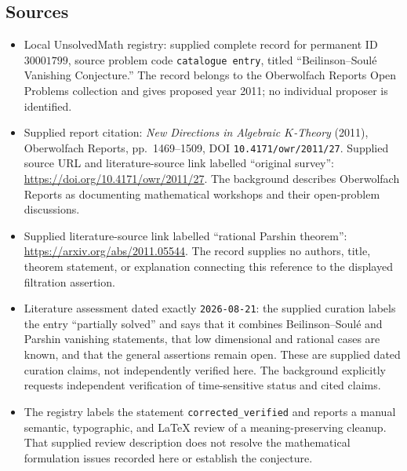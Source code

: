 \documentclass[11pt]{article}
\begin{document}
\subsection{Sources}
\begin{itemize}
\item Local UnsolvedMath registry: supplied complete record for permanent ID \(30001799\), source problem code \texttt{catalogue entry}, titled ``Beilinson--Soul\'e Vanishing Conjecture.'' The record belongs to the Oberwolfach Reports Open Problems collection and gives proposed year 2011; no individual proposer is identified.
\item Supplied report citation: \emph{New Directions in Algebraic \(K\)-Theory} (2011), Oberwolfach Reports, pp.~1469--1509, DOI \texttt{10.4171/owr/2011/27}. Supplied source URL and literature-source link labelled ``original survey'': \url{https://doi.org/10.4171/owr/2011/27}. The background describes Oberwolfach Reports as documenting mathematical workshops and their open-problem discussions.
\item Supplied literature-source link labelled ``rational Parshin theorem'': \url{https://arxiv.org/abs/2011.05544}. The record supplies no authors, title, theorem statement, or explanation connecting this reference to the displayed filtration assertion.
\item Literature assessment dated exactly \texttt{2026-08-21}: the supplied curation labels the entry ``partially solved'' and says that it combines Beilinson--Soul\'e and Parshin vanishing statements, that low dimensional and rational cases are known, and that the general assertions remain open. These are supplied dated curation claims, not independently verified here. The background explicitly requests independent verification of time-sensitive status and cited claims.
\item The registry labels the statement \texttt{corrected\_verified} and reports a manual semantic, typographic, and LaTeX review of a meaning-preserving cleanup. That supplied review description does not resolve the mathematical formulation issues recorded here or establish the conjecture.
\end{itemize}
\end{document}
